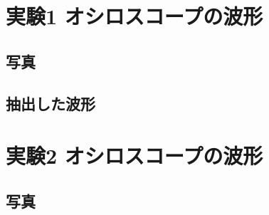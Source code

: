 \documentclass[../../../main]{subfiles}
\begin{document}
\appendix
\section{実験1 オシロスコープの波形}

\subsection{写真}

\clearpage

\subsection{抽出した波形}


\clearpage
\section{実験2 オシロスコープの波形}

\subsection{写真}

\end{document}

